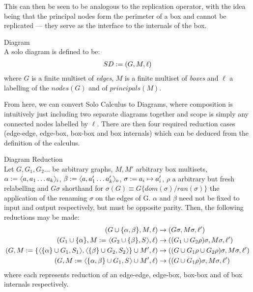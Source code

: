     This can then be seen to be analogous to the replication operator, with the idea being that the principal nodes form the perimeter of a box and cannot be replicated --- they serve as the interface to the internals of the box.

    \begin{definition}{Diagram\\}
        A solo diagram is defined to be:
        \begin{align*}
            SD := (G, M, \ell)
        \end{align*}
        where $G$ is a finite multiset of \textit{edges}, $M$ is a finite multiset of \textit{boxes} and $\ell$ a labelling of the $nodes(G)$ and of $principals(M)$.
    \end{definition}
    
    From here, we can convert Solo Calculus to Diagrams, where composition is intuitively just including two separate diagrams together and scope is simply any connected nodes labelled by $\ell$.
    There are then four required reduction cases (edge-edge, edge-box, box-box and box internals) which can be deduced from the definition of the calculus.

    \begin{definition}{Diagram Reduction\\}
        Let $G, G_1, G_2 \ldots$ be arbitrary graphs, $M, M'$ arbitrary box multisets, $\alpha \defeq \langl a, a_1 \ldots a_k\rangl_i$, $\beta \defeq \langl a, a_1' \ldots a_k'\rangl_o$, $\sigma := a_i \mapsto a_i'$, $\rho$ a arbitrary but fresh relabelling and $G\sigma$ shorthand for $\sigma(G) \equiv G\{dom(\sigma) / ran(\sigma)\}$ the application of the renaming $\sigma$ on the edges of G.
        $\alpha$ and $\beta$ need not be fixed to input and output respectively, but must be opposite parity.
        Then, the following reductions may be made:
        \begin{align*}
            (G \cup \{\alpha, \beta\}, M, \ell)                                                                             & \rightarrow (G\sigma, M\sigma, \ell') \\
            (G_1 \cup \{\alpha\}, M \defeq \langl G_2 \cup \{\beta\}, S\rangl, \ell)                                        & \rightarrow ((G_1 \cup G_2\rho)\sigma, M\sigma, \ell') \\
            (G, M \defeq \{\langl \{ \alpha \} \cup G_1, S_1\rangl,\langl \{ \beta \} \cup G_2, S_2\rangl\} \cup M', \ell)    & \rightarrow ((G \cup G_1\rho \cup G_2\rho)\sigma, M\sigma, \ell') \\
            (G, M \defeq \langl \{ \alpha, \beta \} \cup G_1, S\rangl \cup M', \ell)                                          & \rightarrow ((G \cup G_1\rho)\sigma, M\sigma, \ell')
        \end{align*}
        where each represents reduction of an edge-edge, edge-box, box-box and of box internals respectively.
    \end{definition}

